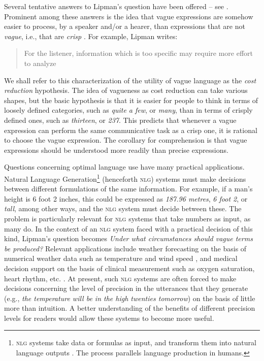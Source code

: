\documentclass[graybox,envcountchap,sectrefs%
,footinfo
]{svmono}
\begin{document}
Several tentative answers to Lipman's question have been offered -- see \citet{van2009utility, van2010vagueness}. Prominent among these answers is the idea that vague expressions are somehow easier to process, by a speaker and/or a hearer, than expressions that are not \emph{vague}, i.e., that are \emph{crisp} \citep[e.g.,][]{lipmanvague,De-Jaegher:2003lr,vanrooij2003lr}. For example, Lipman writes: \begin{quotation}For the listener, information which is too specific may require more effort to analyze \citep[][p.\ 11]{lipmanvague}  \end{quotation} We shall refer to this characterization of the utility of vague language as the \emph{cost reduction} hypothesis. The idea of vagueness as cost reduction can take various shapes, but the basic hypothesis is that it is easier for people to think in terms of loosely defined categories, such as \emph{quite a few}, or \emph{many}, than in terms of crisply defined ones, such as \emph{thirteen}, or \emph{237}. This predicts that whenever a vague expression can perform the same communicative task as a crisp one, it is rational to choose the vague expression. The corollary for comprehension is that vague expressions should be understood more readily than precise expressions. 

Questions concerning optimal language use have many practical applications. Natural Language Generation\footnote{\textsc{nlg} systems take data or formulas as input, and transform them into natural language outputs \citep[][]{reiter2000building}. The process parallels language production in humans.}  (henceforth \textsc{nlg}) systems must make decisions between different formulations of the same information. For example, if a man's height is 6 foot 2 inches, this could be expressed as \emph{187.96 metres}, \emph{6 foot 2}, or \emph{tall}, among other ways, and the \textsc{nlg} system must decide between these.  The problem is particularly relevant for \textsc{nlg} systems that take numbers as input, as many do. In the context of an \textsc{nlg} system faced with a practical decision of this kind, Lipman's question becomes \emph{Under what circumstances should vague terms be produced?}  Relevant applications include weather forecasting on the basis of numerical weather data such as temperature and wind speed \citep{goldberg1994using, turner2006generating}, and medical decision support on the basis of clinical measurement such as oxygen saturation, heart rhythm, etc. \citep{Hripcsak01032009, hunter2008summarising, portet2009automatic}. At present, such \textsc{nlg} systems are often forced to make decisions concerning the level of precision in the utterances that they generate (e.g., \emph{the temperature will be in the high twenties tomorrow}) on the basis of little more than intuition. A better understanding of the benefits of different precision levels for readers would allow these systems to become more useful. 
\end{document}
